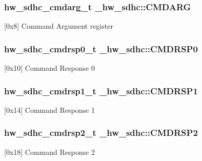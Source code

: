 \subsubsection[{\texorpdfstring{C\+M\+D\+A\+RG}{CMDARG}}]{ {\bf hw\+\_\+sdhc\+\_\+cmdarg\+\_\+t} \+\_\+hw\+\_\+sdhc\+::\+C\+M\+D\+A\+RG}\hypertarget{struct__hw__sdhc_a9f8a67b978da2c43a3686f8c7b321a08}{}\label{struct__hw__sdhc_a9f8a67b978da2c43a3686f8c7b321a08}
\mbox{[}0x8\mbox{]} Command Argument register 
\subsubsection[{\texorpdfstring{C\+M\+D\+R\+S\+P0}{CMDRSP0}}]{ {\bf hw\+\_\+sdhc\+\_\+cmdrsp0\+\_\+t} \+\_\+hw\+\_\+sdhc\+::\+C\+M\+D\+R\+S\+P0}\hypertarget{struct__hw__sdhc_a776f9a9ef3934b257c7241e793669c6c}{}\label{struct__hw__sdhc_a776f9a9ef3934b257c7241e793669c6c}
\mbox{[}0x10\mbox{]} Command Response 0 
\subsubsection[{\texorpdfstring{C\+M\+D\+R\+S\+P1}{CMDRSP1}}]{ {\bf hw\+\_\+sdhc\+\_\+cmdrsp1\+\_\+t} \+\_\+hw\+\_\+sdhc\+::\+C\+M\+D\+R\+S\+P1}\hypertarget{struct__hw__sdhc_ac14b293c1061ecb2ca7a0f66f6826aed}{}\label{struct__hw__sdhc_ac14b293c1061ecb2ca7a0f66f6826aed}
\mbox{[}0x14\mbox{]} Command Response 1 
\subsubsection[{\texorpdfstring{C\+M\+D\+R\+S\+P2}{CMDRSP2}}]{ {\bf hw\+\_\+sdhc\+\_\+cmdrsp2\+\_\+t} \+\_\+hw\+\_\+sdhc\+::\+C\+M\+D\+R\+S\+P2}\hypertarget{struct__hw__sdhc_a0847d6954d20fd429000a9c739316e08}{}\label{struct__hw__sdhc_a0847d6954d20fd429000a9c739316e08}
\mbox{[}0x18\mbox{]} Command Response 2 

